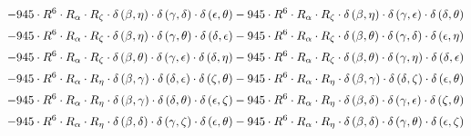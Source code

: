 \begin{subequations}
\begin{gather}
 \\[0.2em] \notag 		 - 945 \cdot R^{6} \cdot R_{\alpha{}} \cdot R_{\zeta{}} \cdot \delta{}\left(\beta{}, \eta{}\right) \cdot \delta{}\left(\gamma{}, \delta{}\right) \cdot \delta{}\left(\epsilon{}, \theta{}\right)- 945 \cdot R^{6} \cdot R_{\alpha{}} \cdot R_{\zeta{}} \cdot \delta{}\left(\beta{}, \eta{}\right) \cdot \delta{}\left(\gamma{}, \epsilon{}\right) \cdot \delta{}\left(\delta{}, \theta{}\right) 
 \\[0.2em] \notag 		 - 945 \cdot R^{6} \cdot R_{\alpha{}} \cdot R_{\zeta{}} \cdot \delta{}\left(\beta{}, \eta{}\right) \cdot \delta{}\left(\gamma{}, \theta{}\right) \cdot \delta{}\left(\delta{}, \epsilon{}\right)- 945 \cdot R^{6} \cdot R_{\alpha{}} \cdot R_{\zeta{}} \cdot \delta{}\left(\beta{}, \theta{}\right) \cdot \delta{}\left(\gamma{}, \delta{}\right) \cdot \delta{}\left(\epsilon{}, \eta{}\right) 
 \\[0.2em] \notag 		 - 945 \cdot R^{6} \cdot R_{\alpha{}} \cdot R_{\zeta{}} \cdot \delta{}\left(\beta{}, \theta{}\right) \cdot \delta{}\left(\gamma{}, \epsilon{}\right) \cdot \delta{}\left(\delta{}, \eta{}\right)- 945 \cdot R^{6} \cdot R_{\alpha{}} \cdot R_{\zeta{}} \cdot \delta{}\left(\beta{}, \theta{}\right) \cdot \delta{}\left(\gamma{}, \eta{}\right) \cdot \delta{}\left(\delta{}, \epsilon{}\right) 
 \\[0.2em] \notag 		 - 945 \cdot R^{6} \cdot R_{\alpha{}} \cdot R_{\eta{}} \cdot \delta{}\left(\beta{}, \gamma{}\right) \cdot \delta{}\left(\delta{}, \epsilon{}\right) \cdot \delta{}\left(\zeta{}, \theta{}\right)- 945 \cdot R^{6} \cdot R_{\alpha{}} \cdot R_{\eta{}} \cdot \delta{}\left(\beta{}, \gamma{}\right) \cdot \delta{}\left(\delta{}, \zeta{}\right) \cdot \delta{}\left(\epsilon{}, \theta{}\right) 
 \\[0.2em] \notag 		 - 945 \cdot R^{6} \cdot R_{\alpha{}} \cdot R_{\eta{}} \cdot \delta{}\left(\beta{}, \gamma{}\right) \cdot \delta{}\left(\delta{}, \theta{}\right) \cdot \delta{}\left(\epsilon{}, \zeta{}\right)- 945 \cdot R^{6} \cdot R_{\alpha{}} \cdot R_{\eta{}} \cdot \delta{}\left(\beta{}, \delta{}\right) \cdot \delta{}\left(\gamma{}, \epsilon{}\right) \cdot \delta{}\left(\zeta{}, \theta{}\right) 
 \\[0.2em] \notag 		 - 945 \cdot R^{6} \cdot R_{\alpha{}} \cdot R_{\eta{}} \cdot \delta{}\left(\beta{}, \delta{}\right) \cdot \delta{}\left(\gamma{}, \zeta{}\right) \cdot \delta{}\left(\epsilon{}, \theta{}\right)- 945 \cdot R^{6} \cdot R_{\alpha{}} \cdot R_{\eta{}} \cdot \delta{}\left(\beta{}, \delta{}\right) \cdot \delta{}\left(\gamma{}, \theta{}\right) \cdot \delta{}\left(\epsilon{}, \zeta{}\right) 

\end{gather}
\end{subequations}
